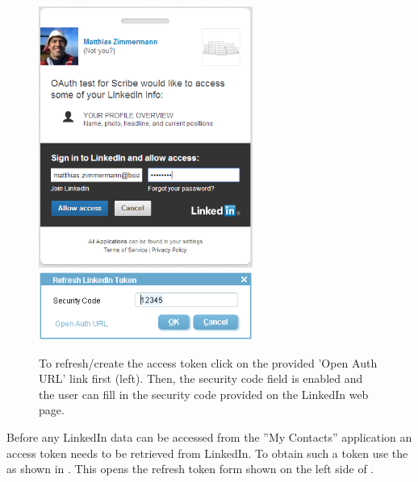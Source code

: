 \documentclass[a4paper,10pt,twoside]{book}
\begin{document}
\begin{figure}
\includegraphics[width=7cm]{my_contacts_rayo_openauthurl.png} \hspace{5mm}
\includegraphics[width=7cm]{my_contacts_rayo_entercode.png}
\caption{To refresh/create the access token click on the provided 'Open Auth URL' link first (left). 
Then, the security code field is enabled and the user can fill in the security code provided on the LinkedIn web page. }
\end{figure}

Before any LinkedIn data can be accessed from the ''My Contacts'' application an access token needs to be retrieved from LinkedIn. 
To obtain such a token use the  as shown in . 
This opens the refresh token form shown on the left side of . 
\end{document}
